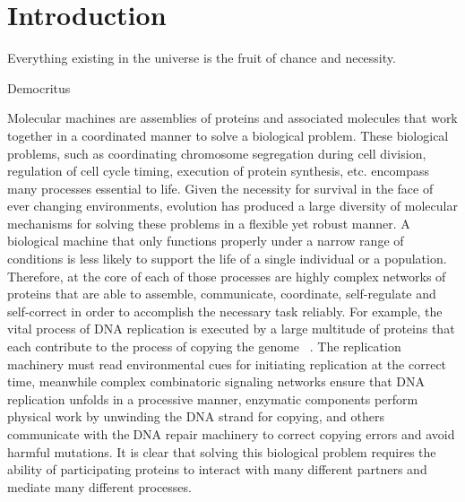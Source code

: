 \chapter{Introduction}


\epigraph{Everything existing in the universe is the fruit of chance and necessity.}{Democritus}

Molecular  machines  are  assemblies of proteins and associated molecules that  work together  in a coordinated manner  to solve a biological problem.  These biological problems, such as coordinating chromosome segregation  during cell division, regulation of cell cycle timing, execution of protein  synthesis, etc.  encompass many processes essential to life. Given the necessity for survival in the face of ever changing environments,  evolution has produced a large diversity of molecular mechanisms for solving these problems in a flexible yet robust  manner.  A biological machine that  only functions properly under a narrow range of  conditions is less likely to support the life of a single individual or a population.  Therefore,  at the core of each of those processes are highly complex networks of proteins that  are able to assemble, communicate, coordinate,  self-regulate and self-correct in order to accomplish the necessary task reliably.  For example, the vital process of DNA replication is executed by a large multitude of proteins that  each contribute to the process of copying the genome ~\cite{bell2002dna}. The replication  machinery must read environmental  cues for initiating  replication  at the correct time, meanwhile complex combinatoric  signaling networks ensure that  DNA replication  unfolds in a processive manner,  enzymatic components  perform physical work by unwinding the DNA strand  for copying, and others  communicate  with theDNA repair machinery  to correct copying errors and avoid harmful mutations. It is clear that  solving this biological problem requires the ability of participating proteins to interact  with many different partners  and mediate  many different processes.



